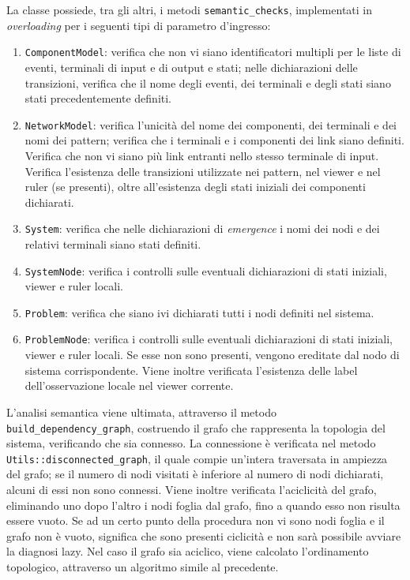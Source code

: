 La classe possiede, tra gli altri, i metodi \verb|semantic_checks|, implementati in \emph{overloading} per i seguenti tipi di parametro d'ingresso:
\begin{enumerate}
\item \verb|ComponentModel|: verifica che non vi siano identificatori multipli per le liste di eventi, terminali di input e di output e stati; nelle dichiarazioni delle transizioni, verifica che il nome degli eventi, dei terminali e degli stati siano stati precedentemente definiti. 
\item \verb|NetworkModel|: verifica l'unicità del nome dei componenti, dei terminali e dei nomi dei pattern;
verifica che i terminali e i componenti dei link siano definiti. Verifica che non vi siano più link entranti nello stesso terminale di input. Verifica l'esistenza delle transizioni utilizzate nei pattern, nel viewer e nel ruler (se presenti), oltre all'esistenza degli stati iniziali dei componenti dichiarati.
\item \verb|System|: verifica che nelle dichiarazioni di \emph{emergence} i nomi dei nodi e dei relativi terminali siano stati definiti.
\item \verb|SystemNode|: verifica i controlli sulle eventuali dichiarazioni di stati iniziali, viewer e ruler locali.
\item \verb|Problem|: verifica che siano ivi dichiarati tutti i nodi definiti nel sistema.
\item \verb|ProblemNode|: verifica i controlli sulle eventuali dichiarazioni di stati iniziali, viewer e ruler locali. Se esse non sono presenti, vengono ereditate dal nodo di sistema corrispondente. Viene inoltre verificata l'esistenza delle label dell'osservazione locale nel viewer corrente.
\end{enumerate}
L'analisi semantica viene ultimata, attraverso il metodo \verb|build_dependency_graph|, costruendo il grafo che rappresenta la topologia del sistema, verificando che sia connesso. La connessione è verificata nel metodo \verb|Utils::disconnected_graph|, il quale compie un'intera traversata in ampiezza del grafo; se il numero di nodi visitati è inferiore al numero di nodi dichiarati, alcuni di essi non sono connessi. 
Viene inoltre verificata l'aciclicità del grafo, eliminando uno dopo l'altro i nodi foglia dal grafo, fino a quando esso non risulta essere vuoto. Se ad un certo punto della procedura non vi sono nodi foglia e il grafo non è vuoto, significa che sono presenti ciclicità e non sarà possibile avviare la diagnosi lazy.
Nel caso il grafo sia aciclico, viene calcolato l'ordinamento topologico, attraverso un algoritmo simile al precedente. 

